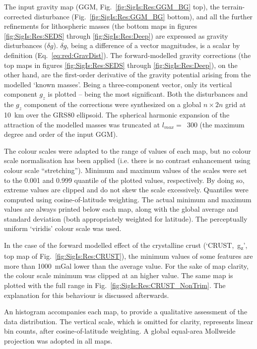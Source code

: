 The input gravity map ({GGM}, Fig.~\ref{fig:SigIs:Res:GGM_BG} top), the terrain-corrected disturbance (Fig.~\ref{fig:SigIs:Res:GGM_BG} bottom), and all the further refinements for lithospheric masses (the bottom maps in figures \ref{fig:SigIs:Res:SEDS} through \ref{fig:SigIs:Res:Deep}) are expressed as gravity disturbances ($\delta g$).
$\delta g$, being a difference of a vector magnitudes, is a scalar by definition (Eq.~\ref{eq:red:GravDist}).
The forward-modelled gravity corrections (the top maps in figures \ref{fig:SigIs:Res:SEDS} through \ref{fig:SigIs:Res:Deep}), on the other hand, are the first-order derivative of the gravity potential arising from the modelled `known masses'.
Being a three-component vector, only its vertical component $g_z$ is plotted -- being the most significant.
Both the disturbances and the $g_z$ component of the corrections were synthesized on a global $n \times 2n$ grid at \SI{10}{\kilo \metre} over the {GRS80} ellipsoid.
The spherical harmonic expansion of the attraction of the modelled masses was truncated at $l_{max} =$~\num{300} (the maximum degree and order of the input {GGM}).

The colour scales were adapted to the range of values of each map, but no colour scale normalisation has been applied (i.e. there is no contrast enhancement using colour scale ``stretching'').
Minimum and maximum values of the scales were set to the \num{0.001} and \num{0.999} quantile of the plotted values, respectively.
By doing so, extreme values are clipped and do not skew the scale excessively.
Quantiles were computed using cosine-of-latitude weighting.
The actual minimum and maximum values are always printed below each map, along with the global average and standard deviation (both appropriately weighted for latitude).
The perceptually uniform `viridis' colour scale \parencite{Smith2015} was used.

In the case of the forward modelled effect of the crystalline crust (`CRUST,~g\textsubscript{z}', top map of Fig.~\ref{fig:SigIs:Res:CRUST}), the minimum values of some features are more than \SI{1000}{mGal} lower than the average value.
For the sake of map clarity, the colour scale minimum was clipped at an higher value.
The same map is plotted with the full range in Fig.~\ref{fig:SigIs:Res:CRUST_NonTrim}.
The explanation for this behaviour is discussed afterwards.

An histogram accompanies each map, to provide a qualitative assessment of the data distribution.
The vertical scale, which is omitted for clarity, represents linear bin counts, after cosine-of-latitude weighting.
A global equal-area Mollweide projection was adopted in all maps.


